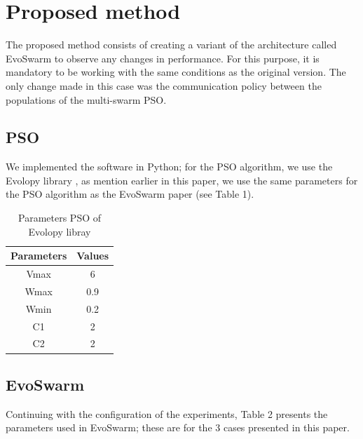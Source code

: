 \documentclass[runningheads]{llncs}
\begin{document}
\section{Proposed method}

The proposed method consists of creating a variant of the architecture called EvoSwarm to observe any changes in performance. For this purpose, it is mandatory to be working with the same conditions as the original version. The only change made in this case was the communication policy between the populations of the multi-swarm PSO.

\subsection{PSO}
We implemented the software in Python; for the PSO algorithm, we use the Evolopy library \cite{b19}, as mention earlier in this paper, we use the same parameters for the PSO algorithm as the EvoSwarm paper (see Table 1).

\begin{table}[h!]
\centering
\caption{Parameters PSO of Evolopy libray}
\begin{tabular}{|c c|} 
 \hline
 Parameters & Values  \\ [0.5ex] 
 \hline\hline
 Vmax & 6 \\ 
 Wmax & 0.9 \\
 Wmin & 0.2 \\
C1 & 2 \\
C2 & 2 \\[0.5ex]
 \hline
\end{tabular}
\label{table:1}
\end{table}

\subsection{EvoSwarm}
Continuing with the configuration of the experiments, Table 2 presents the parameters used in EvoSwarm; these are for the 3 cases presented in this paper. 

\begin{table}[h]
\centering
\caption{Parameters for EvoSwarm}
\label{table:1}
\end{table}
\end{document}
